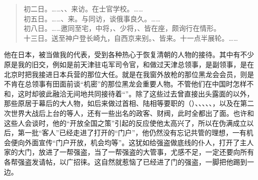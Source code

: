 \begin{quote}
初二日。……、、来访。在士官学校。……\\

初五日。……、来。与同访，谈俄事良久。……\\

初八日。……邀同至宅，中将，、少将，、皆在座，颇询行在情形。\\

十三日。送至神户登长崎九，自西京来别。、皆来。十一点半展轮。……\\
\end{quote}

他在日本，被当做我的代表，受到各种热心于恢复清朝的人物的接待。其中有不少原是我的旧交，例如是前天津驻屯军司令官，和做过天津总领事，是副领事，是在北京时把我接进日本兵营的那位大任。就是在我窗外放枪的那位黑龙会会员，则是不肯在总领事有田面前谈“机密”的那位黑龙会重要人物。不管他们在中国时怎样不和，这时却彼此融洽无间地共同接待着“”。除了这些过去曾直接出头露面的以外，那些原居于幕后的大人物，如后来做过首相、陆相等要职的（）、、、、、，以及在第二次世界大战后上台的等人，还有一些出名的政客、财阀，此时全都出了面。也许和这些人会谈时，他的“开放全国之策”引起的反应使他太高兴了，所以在伪满成立以后，第一批“客人”已经走进了打开的“门户”，他仍然没有忘记共管的理想，一有机会便向外面宣传“门户开放，机会均等”。这犹如给强盗做底线的仆人，打开了主人家的大门，放进了一帮强盗，当了一帮强盗的大管事，尤感不足，一定还要向所有各帮强盗发请帖，以广招徕。这自然就惹恼了已经进了门的强盗，一脚把他踢到一边。

